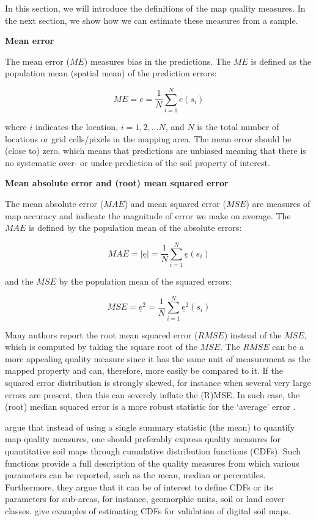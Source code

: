 \documentclass[10pt,b5paper,]{book}
\theoremstyle{definition}
\theoremstyle{definition}
\theoremstyle{definition}
\theoremstyle{remark}
\begin{document}
In this section, we will introduce the definitions of the map quality
measures. In the next section, we show how we can estimate these
measures from a sample.

\textbf{Mean error}

The mean error (\({ME}\)) measures bias in the predictions. The \({ME}\)
is defined as the population mean (spatial mean) of the prediction
errors:

\begin{equation}
M E = e = \frac{1}{N} \sum_{i=1}^{N} e (s_i)
\end{equation}

where \(i\) indicates the location, \({i = 1, 2,\dots N}\), and \(N\) is
the total number of locations or grid cells/pixels in the mapping area.
The mean error should be (close to) zero, which means that predictions
are unbiased meaning that there is no systematic over- or
under-prediction of the soil property of interest.

\textbf{Mean absolute error and (root) mean squared error}

The mean absolute error (\({MAE}\)) and mean squared error (\({MSE}\))
are measures of map accuracy and indicate the magnitude of error we make
on average. The \({MAE}\) is defined by the population mean of the
absolute errors:

\begin{equation}
M A E = |\underline{e}| = \frac{1}{N} \sum_{i=1}^{N} \underline{e} (s_i)
\end{equation}

and the \({MSE}\) by the population mean of the squared errors:

\begin{equation}
M S E = \underline{e}^2 = \frac{1}{N} \sum_{i=1}^{N} \underline{e}^2 (s_i)
\end{equation}

Many authors report the root mean squared error (\({RMSE}\)) instead of
the \({MSE}\), which is computed by taking the square root of the
\({MSE}\). The \({RMSE}\) can be a more appealing quality measure since
it has the same unit of measurement as the mapped property and can,
therefore, more easily be compared to it. If the squared error
distribution is strongly skewed, for instance when several very large
errors are present, then this can severely inflate the (R)MSE. In such
case, the (root) median squared error is a more robust statistic for the
`average' error \citep{kempen2012efficiency}.

\citet{brus2011sampling} argue that instead of using a single summary
statistic (the mean) to quantify map quality measures, one should
preferably express quality measures for quantitative soil maps through
cumulative distribution functions (CDFs). Such functions provide a full
description of the quality measures from which various parameters can be
reported, such as the mean, median or percentiles. Furthermore, they
argue that it can be of interest to define CDFs or its parameters for
sub-areas, for instance, geomorphic units, soil or land cover classes.
\citet{brus2011sampling} give examples of estimating CDFs for validation
of digital soil maps.
\end{document}
